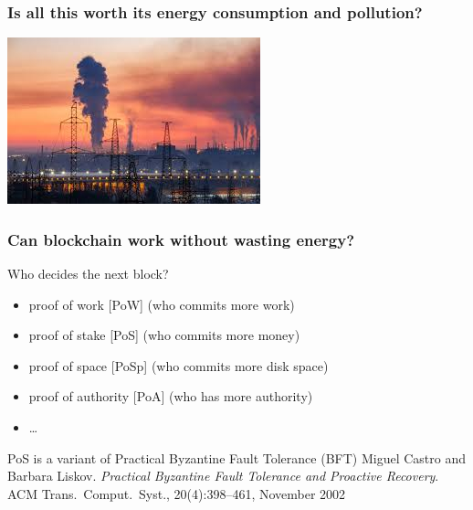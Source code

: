 \documentclass[11pt]{beamer}  %
\begin{document}
\begin{frame}\frametitle{Is all this worth its energy consumption and pollution?}

  \begin{center}
    \includegraphics[scale=1, clip=false]{pictures/pollution.jpg}
  \end{center}

\end{frame}

\begin{frame}
  \frametitle{Can blockchain work without wasting energy?}

  \begin{center}
    Who decides the next block?
  \end{center}

  \bigskip

  \begin{greenbox}{}
    \begin{itemize}
    \item proof of work [PoW] (who commits more work)
    \item proof of stake [PoS] (who commits more money)
    \item proof of space [PoSp] (who commits more disk space)
    \item proof of authority [PoA] (who has more authority)
    \item \ldots
    \end{itemize}
  \end{greenbox}

  \bigskip

  \begin{greenbox}{PoS is a variant of Practical Byzantine Fault Tolerance (BFT)}
    Miguel Castro and Barbara Liskov.
    \emph{Practical Byzantine Fault Tolerance and Proactive Recovery}.
    ACM Trans.\ Comput.\ Syst., 20(4):398–461, November 2002
  \end{greenbox}

\end{frame}
\end{document}
